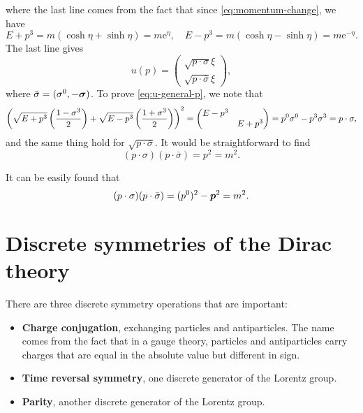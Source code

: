 \documentclass[hyperref, a4paper]{article}
\newcommand*{\ee}{\mathrm{e}}
\newcommand*{\concept}[1]{{\textbf{#1}}}
\begin{document}
where the last line comes from the fact that since \eqref{eq:momentum-change}, we have 
\[
    E + p^3 = m (\cosh \eta + \sinh \eta) = m \ee^{\eta}, \quad 
    E - p^3 = m (\cosh \eta - \sinh \eta) = m \ee^{-\eta}.
\]
The last line gives 
\begin{equation}
    u(p) = \left(\begin{array}{c}
        \sqrt{p \cdot \sigma} \xi \\
        \sqrt{p \cdot \bar{\sigma}} \xi
        \end{array}\right),
    \label{eq:u-general-p}
\end{equation}
where $\bar{\sigma} = (\sigma^0, - \vb*{\sigma})$. 
To prove \eqref{eq:u-general-p}, we note that 
\[
    \left(\sqrt{E+p^{3}}\left(\frac{1-\sigma^{3}}{2}\right)+\sqrt{E-p^{3}}\left(\frac{1+\sigma^{3}}{2}\right)\right)^2 = 
    \pmqty{\dmat{E - p^3, E + p^3}} = p^0 \sigma^0 - p^3 \sigma^3 = p \cdot \sigma,
\]
and the same thing hold for $\sqrt{p \cdot \bar{\sigma}}$. 
It would be straightforward to find 
\begin{equation}
    (p \cdot \sigma)(p \cdot \bar{\sigma})=p^{2}=m^{2}.
\end{equation}

It can be easily found that 
\begin{equation}
    (p \cdot \sigma) (p \cdot \bar{\sigma}) = (p^0)^2 - \vb*{p}^2 = m^2.
\end{equation}

\section{Discrete symmetries of the Dirac theory}

There are three discrete symmetry operations that are important: 
\begin{itemize}
    \item \concept{Charge conjugation}, exchanging particles and antiparticles. The name comes from 
    the fact that in a gauge theory, particles and antiparticles carry charges that are equal in 
    the absolute value but different in sign. 
    \item \concept{Time reversal symmetry}, one discrete generator of the Lorentz group.
    \item \concept{Parity}, another discrete generator of the Lorentz group.
\end{itemize}
\end{document}
